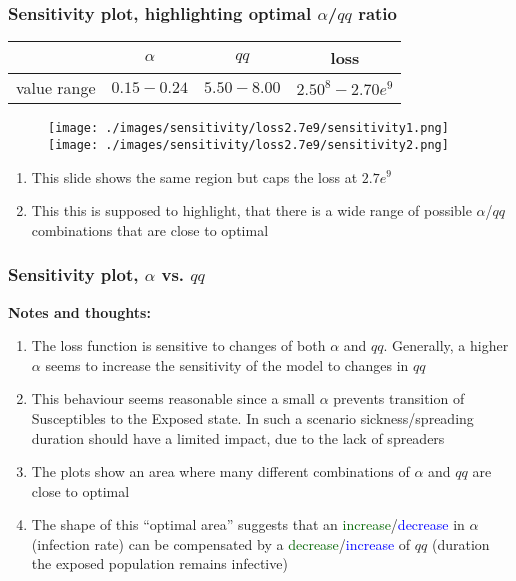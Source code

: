 \documentclass{beamer}
\begin{document}
\begin{frame}
	\frametitle{Sensitivity plot, highlighting optimal $\alpha$/$qq$ ratio}
	\begin{center}
		\begin{tabular}{|c|c|c|c|}
			\hline & $\alpha$ & $qq$ & loss \\
			\hline value range & $0.15-0.24$ & $5.50-8.00$ & $2.50^{8}-2.70e^{9}$\\
			\hline
		\end{tabular}
		\vspace{-0.3cm}
		\begin{figure}
				\hspace{-1.4cm}
				\texttt{[image: ./images/sensitivity/loss2.7e9/sensitivity1.png]}\hspace{-1cm}%
				\texttt{[image: ./images/sensitivity/loss2.7e9/sensitivity2.png]}
		\end{figure}
	\begin{enumerate}[$\bullet$]
		\item \vspace{-0.6cm} This slide shows the same region but caps the loss at $2.7e^{9}$
		\item This this is supposed to highlight, that there is a wide range of possible $\alpha$/$qq$ combinations that are close to optimal
	\end{enumerate}
	\end{center}
\end{frame}

\begin{frame}
	\frametitle{Sensitivity plot, $\alpha$ vs. $qq$}
	\textbf{Notes and thoughts:}
	\begin{enumerate}[$\bullet$]
		\item The loss function is sensitive to changes of both $\alpha$ and $qq$. Generally, a higher $\alpha$
			seems to increase the sensitivity of the model to changes in $qq$
		\item This behaviour seems reasonable since a small $\alpha$ prevents transition of Susceptibles to the Exposed state. In such a scenario
			sickness/spreading duration should have a limited impact, due to the lack of spreaders
		\item The plots show an area where many different combinations of  $\alpha$ and $qq$ are close to optimal
		\item The shape of this ``optimal area'' suggests that an \textcolor{darkgreen}{increase}/\textcolor{blue}{decrease}
			in $\alpha$ (infection rate) can be compensated by a \textcolor{darkgreen}{decrease}/\textcolor{blue}{increase}
			of $qq$ (duration the exposed population remains infective)
	\end{enumerate}
\end{frame}
\end{document}
